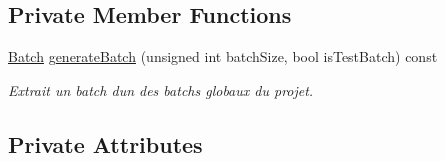 \subsection*{Private Member Functions}
\begin{DoxyCompactItemize}
\item 
\hyperlink{classApplication_a9888f02149ca3b8ffa499ee07426cd1d}{Batch} \hyperlink{classApplication_a354527f371bf64ce05992bf1af5008da}{generate\+Batch} (unsigned int batch\+Size, bool is\+Test\+Batch) const
\begin{DoxyCompactList}\small\item\em Extrait un batch d\textquotesingle{}un des batchs globaux du projet. \end{DoxyCompactList}\end{DoxyCompactItemize}
\subsection*{Private Attributes}
